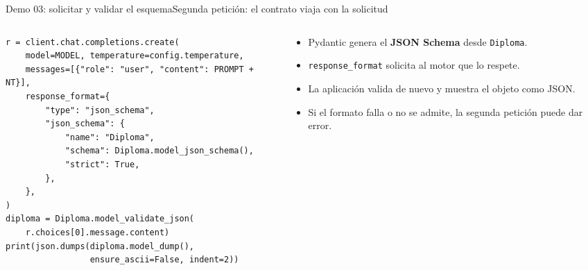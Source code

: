\begin{frame}[fragile]{Demo 03: solicitar y validar el esquema}{Segunda petición: el contrato viaja con la solicitud}
	\begin{columns}[T]
		\begin{column}{0.6\textwidth}
			\begin{lstlisting}
r = client.chat.completions.create(
    model=MODEL, temperature=config.temperature,
    messages=[{"role": "user", "content": PROMPT + NT}],
    response_format={
        "type": "json_schema",
        "json_schema": {
            "name": "Diploma",
            "schema": Diploma.model_json_schema(),
            "strict": True,
        },
    },
)
diploma = Diploma.model_validate_json(
    r.choices[0].message.content)
print(json.dumps(diploma.model_dump(),
                 ensure_ascii=False, indent=2))
\end{lstlisting}
		\end{column}
		\begin{column}{0.38\textwidth}
			\footnotesize
			\begin{itemize}
				\item Pydantic genera el \textbf{JSON Schema} desde \texttt{Diploma}.
				\item \texttt{response\_format} solicita al motor que lo respete.
				\item La aplicación valida de nuevo y muestra el objeto como JSON.
				\item Si el formato falla o no se admite, la segunda petición puede dar error.
			\end{itemize}
		\end{column}
	\end{columns}
\end{frame}

